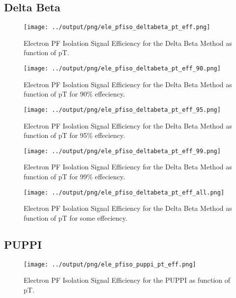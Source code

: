 \documentclass[11pt]{book}
\begin{document}
\subsection{Delta Beta}
\begin{figure}[htb]
\centering
\texttt{[image: ../output/png/ele\_pfiso\_deltabeta\_pt\_eff.png]}
\caption{Electron PF Isolation Signal Efficiency for the Delta Beta Method as function of pT.}
\label{fig:ele_pfiso_pt_eff_deltabeta}
\end{figure}

\begin{figure}[htb]
\centering
\texttt{[image: ../output/png/ele\_pfiso\_deltabeta\_pt\_eff\_90.png]}
\caption{Electron PF Isolation Signal Efficiency for the Delta Beta Method as function of pT for 90\% effeciency.}
\label{fig:ele_pfiso_pt_eff_deltabeta_eff_90}
\end{figure}

\begin{figure}[htb]
\centering
\texttt{[image: ../output/png/ele\_pfiso\_deltabeta\_pt\_eff\_95.png]}
\caption{Electron PF Isolation Signal Efficiency for the Delta Beta Method as function of pT for 95\% effeciency.}
\label{fig:ele_pfiso_pt_eff_deltabeta_eff_95}
\end{figure}

\begin{figure}[htb]
\centering
\texttt{[image: ../output/png/ele\_pfiso\_deltabeta\_pt\_eff\_99.png]}
\caption{Electron PF Isolation Signal Efficiency for the Delta Beta Method as function of pT for 99\% effeciency.}
\label{fig:ele_pfiso_pt_eff_deltabeta_eff_99}
\end{figure}

\begin{figure}[htb]
\centering
\texttt{[image: ../output/png/ele\_pfiso\_deltabeta\_pt\_eff\_all.png]}
\caption{Electron PF Isolation Signal Efficiency for the Delta Beta Method as function of pT for some effeciency.}
\label{fig:ele_pfiso_pt_eff_deltabeta_eff_all}
\end{figure}
\clearpage

\subsection{PUPPI}
\begin{figure}[htb]
\centering
\texttt{[image: ../output/png/ele\_pfiso\_puppi\_pt\_eff.png]}
\caption{Electron PF Isolation Signal Efficiency for the PUPPI as function of pT.}
\label{fig:ele_pfiso_pt_eff_puppi}
\end{figure}
\end{document}
